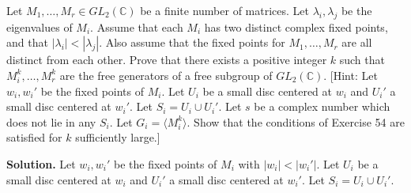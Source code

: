 \begin{problembox}
Let $M_1, \ldots, M_r \in GL_2(\mathbb{C})$ be a finite number of matrices. Let $\lambda_i, \lambda_j$ be the eigenvalues of $M_i$. Assume that each $M_i$ has two distinct complex fixed points, and that $|\lambda_i| < |\lambda_j|$. Also assume that the fixed points for $M_1, \ldots, M_r$ are all distinct from each other. Prove that there exists a positive integer $k$ such that $M_i^k, \ldots, M_r^k$ are the free generators of a free subgroup of $GL_2(\mathbb{C})$. [Hint: Let $w_i, w_i'$ be the fixed points of $M_i$. Let $U_i$ be a small disc centered at $w_i$ and $U_i'$ a small disc centered at $w_i'$. Let $S_i = U_i \cup U_i'$. Let $s$ be a complex number which does not lie in any $S_i$. Let $G_i = \langle M_i^k \rangle$. Show that the conditions of Exercise 54 are satisfied for $k$ sufficiently large.]

\end{problembox}

\noindent\textbf{Solution.} Let $w_i, w_i'$ be the fixed points of $M_i$ with $|w_i| < |w_i'|$. Let $U_i$ be a small disc centered at $w_i$ and $U_i'$ a small disc centered at $w_i'$. Let $S_i = U_i \cup U_i'$.

